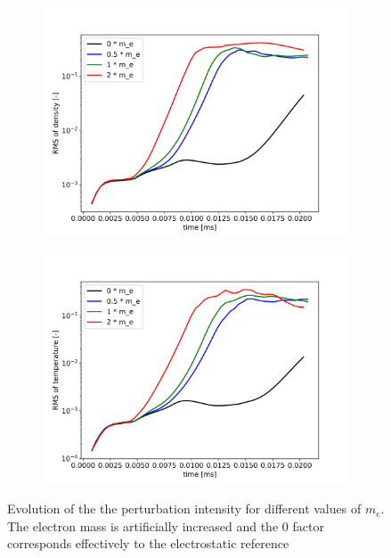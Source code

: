 \begin{figure}[H]\centering
	\begin{subfigure}[t]{0.45\textwidth}
		\centering
		\includegraphics[width=1\textwidth]{schemes/RMSn_meScan.jpg}
	\end{subfigure}
	\begin{subfigure}[t]{0.45\textwidth}
		\centering
		\includegraphics[width=1\textwidth]{schemes/RMST_meScan.jpg}
	\end{subfigure}
	\caption{Evolution of the the perturbation intensity for different values of $m_e$. The electron mass is artificially increased and the 0 factor corresponds effectively to the electrostatic reference}
	\label{fig:CIRC_meScan}
\end{figure}



